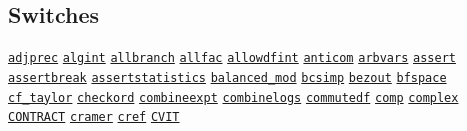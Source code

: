 \begin{list}{}
\section{Switches}

\doubleinterwordspace
\hyperlink{switch:ADJPREC}{\texttt{adjprec}}
\hyperlink{switch:ALGINT}{\texttt{algint}}
\hyperlink{switch:ALLBRANCH}{\texttt{allbranch}}
\hyperlink{switch:ALLFAC}{\texttt{allfac}}
\hyperlink{switch:ALLOWDFINT}{\texttt{allowdfint}}
\hyperlink{switch:ANTICOM}{\texttt{anticom}}
\hyperlink{switch:ARBVARS}{\texttt{arbvars}}
\hyperlink{switch:ASSERT}{\texttt{assert}}
\hyperlink{switch:ASSERTBREAK}{\texttt{assertbreak}}
\hyperlink{switch:ASSERTSTATISTICS}{\texttt{assertstatistics}}
\hyperlink{switch:BALANCED_MOD}{\texttt{balanced\_mod}}
\hyperlink{switch:BCSIMP}{\texttt{bcsimp}}
\hyperlink{switch:BEZOUT}{\texttt{bezout}}
\hyperlink{switch:BFSPACE}{\texttt{bfspace}}
\hyperlink{switch:CF_TAYLOR}{\texttt{cf\_taylor}}
\hyperlink{switch:CHECKORD}{\texttt{checkord}}
\hyperlink{switch:COMBINEEXPT}{\texttt{combineexpt}}
\hyperlink{switch:COMBINELOGS}{\texttt{combinelogs}}
\hyperlink{switch:COMMUTEDF}{\texttt{commutedf}}
\hyperlink{switch:COMP}{\texttt{comp}}
\hyperlink{switch:COMPLEX}{\texttt{complex}}
\hyperlink{switch:CONTRACT}{\texttt{CONTRACT}}
\hyperlink{switch:CRAMER}{\texttt{cramer}}
\hyperlink{switch:CREF}{\texttt{cref}}
\hyperlink{switch:CVIT}{\texttt{CVIT}}

\end{list}
